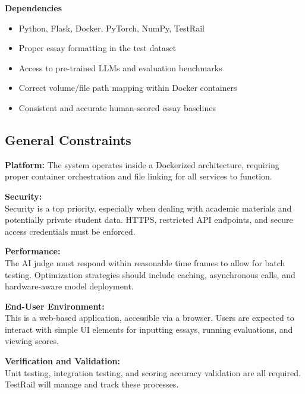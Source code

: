 \documentclass[12pt]{article}
\begin{document}
\vspace{1em}

\textbf{Dependencies}
\begin{itemize}
    \item Python, Flask, Docker, PyTorch, NumPy, TestRail
    \item Proper essay formatting in the test dataset
    \item Access to pre-trained LLMs and evaluation benchmarks
    \item Correct volume/file path mapping within Docker containers
    \item Consistent and accurate human-scored essay baselines
\end{itemize}

\subsection{General Constraints}

\textbf{Platform:} The system operates inside a Dockerized architecture, requiring proper container orchestration and file linking for all services to function.

\vspace{1em}

\textbf{Security:}\\
Security is a top priority, especially when dealing with academic materials and potentially private student data. HTTPS, restricted API endpoints, and secure access credentials must be enforced.

\vspace{1em}

\textbf{Performance:}\\
The AI judge must respond within reasonable time frames to allow for batch testing. Optimization strategies should include caching, asynchronous calls, and hardware-aware model deployment.

\vspace{1em}

\textbf{End-User Environment:}\\
This is a web-based application, accessible via a browser. Users are expected to interact with simple UI elements for inputting essays, running evaluations, and viewing scores.

\vspace{1em}

\textbf{Verification and Validation:}\\
Unit testing, integration testing, and scoring accuracy validation are all required. TestRail will manage and track these processes.
\end{document}
